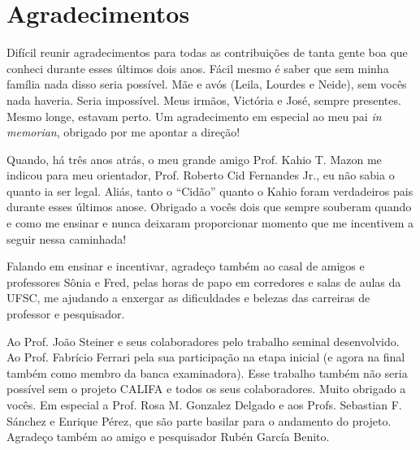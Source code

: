 

\chapter*{Agradecimentos}

Difícil reunir agradecimentos para todas as contribuições de tanta gente boa que conheci durante esses últimos dois
anos. Fácil mesmo é saber que sem minha família nada disso seria possível. Mãe e avós (Leila, Lourdes e Neide), sem
vocês nada haveria. Seria impossível. Meus irmãos, Victória e José, sempre presentes. Mesmo longe, estavam perto. Um
agradecimento em especial ao meu pai {\em in memorian}, obrigado por me apontar a direção!

Quando, há três anos atrás, o meu grande amigo Prof. Kahio T. Mazon me indicou para meu orientador, Prof. Roberto Cid
Fernandes Jr., eu não sabia o quanto ia ser legal. Aliás, tanto o ``Cidão'' quanto o Kahio foram verdadeiros pais
durante esses últimos anose. Obrigado a vocês dois que sempre souberam quando e como me ensinar e nunca deixaram
proporcionar momento que me incentivem a seguir nessa caminhada!

Falando em ensinar e incentivar, agradeço também ao casal de amigos e professores Sônia e Fred, pelas horas de papo em
corredores e salas de aulas da UFSC, me ajudando a enxergar as dificuldades e belezas das carreiras de professor e
pesquisador.

Ao Prof. João Steiner e seus colaboradores pelo trabalho seminal desenvolvido. Ao Prof. Fabrício Ferrari pela sua
participação na etapa inicial (e agora na final também como membro da banca examinadora). Esse trabalho também não seria
possível sem o projeto CALIFA e todos os seus colaboradores. Muito obrigado a vocês. Em especial a Prof. Rosa M.
Gonzalez Delgado e aos Profs. Sebastian F. Sánchez e Enrique Pérez, que são parte basilar para o andamento do projeto.
Agradeço também ao amigo e pesquisador Rubén García Benito.

